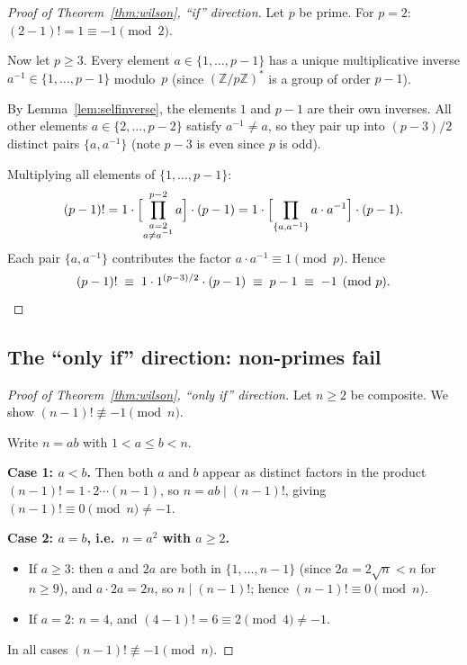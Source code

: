 \documentclass[12pt,a4paper]{amsart}
\theoremstyle{definition}
\newcommand{\Z}{\mathbb{Z}}
\begin{document}
\begin{proof}[Proof of Theorem~\ref{thm:wilson}, ``if'' direction]
  Let $p$ be prime.  For $p = 2$: $(2-1)! = 1 \equiv -1 \pmod 2$. \checkmark

  Now let $p \geq 3$.
  Every element $a \in \{1,\ldots,p-1\}$ has a unique multiplicative
  inverse $a^{-1} \in \{1,\ldots,p-1\}$ modulo~$p$
  (since $(\Z/p\Z)^*$ is a group of order $p-1$).

  By Lemma~\ref{lem:selfinverse}, the elements $1$ and $p-1$ are their own
  inverses.  All other elements $a \in \{2,\ldots,p-2\}$ satisfy $a^{-1} \ne a$,
  so they pair up into $(p-3)/2$ distinct pairs $\{a, a^{-1}\}$
  (note $p-3$ is even since $p$ is odd).

  Multiplying all elements of $\{1,\ldots,p-1\}$:
  \[
    (p-1)!
    = 1 \cdot \Bigl[\prod_{\substack{a=2 \\ a \ne a^{-1}}}^{p-2} a\Bigr]
      \cdot (p-1)
    = 1 \cdot \Bigl[\prod_{\{a,a^{-1}\}} a \cdot a^{-1}\Bigr] \cdot (p-1).
  \]
  Each pair $\{a, a^{-1}\}$ contributes the factor $a \cdot a^{-1} \equiv 1 \pmod p$.
  Hence
  \[
    (p-1)! \;\equiv\; 1 \cdot 1^{(p-3)/2} \cdot (p-1)
             \;\equiv\; p-1 \;\equiv\; -1 \pmod p. \qedhere
  \]
\end{proof}

\subsection{The ``only if'' direction: non-primes fail}

\begin{proof}[Proof of Theorem~\ref{thm:wilson}, ``only if'' direction]
  Let $n \geq 2$ be composite.  We show $(n-1)! \not\equiv -1 \pmod n$.

  Write $n = ab$ with $1 < a \leq b < n$.

  \textbf{Case 1: $a < b$.}
  Then both $a$ and $b$ appear as distinct factors in the product
  $(n-1)! = 1 \cdot 2 \cdots (n-1)$,
  so $n = ab \mid (n-1)!$, giving $(n-1)! \equiv 0 \pmod n \ne -1$.

  \textbf{Case 2: $a = b$, i.e.\ $n = a^2$ with $a \geq 2$.}
  \begin{itemize}
    \item If $a \geq 3$: then $a$ and $2a$ are both in $\{1,\ldots,n-1\}$
      (since $2a = 2\sqrt{n} < n$ for $n \geq 9$), and $a \cdot 2a = 2n$,
      so $n \mid (n-1)!$; hence $(n-1)! \equiv 0 \pmod n$.
    \item If $a = 2$: $n = 4$, and $(4-1)! = 6 \equiv 2 \pmod 4 \ne -1$.
  \end{itemize}
  In all cases $(n-1)! \not\equiv -1 \pmod n$. \qedhere
\end{proof}
\end{document}

